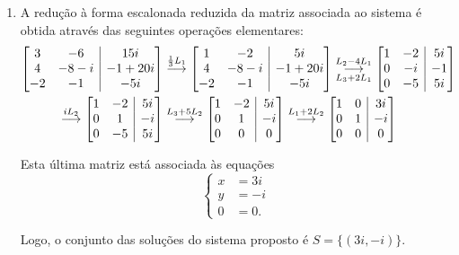 \documentclass[12pt,a4paper]{article}
\makeatletter
\newenvironment{amatrix}[1]{%
  \left[\begin{array}{@{}*{#1}{c}|c@{}}
}{%
  \end{array}\right]
}
\newcommand{\grstep}[2][\relax]{%
   \ensuremath{\mathrel{
       {\mathop{\longrightarrow}\limits^{#2\mathstrut}_{
                                     \begin{subarray}{l} #1 \end{subarray}}}}}}
\makeatother
\begin{document}
\begin{enumerate}
\begin{enumerate}
\item A redução à forma escalonada reduzida da matriz associada ao sistema é obtida através das seguintes operações elementares:
\begin{align*}
\begin{amatrix}{2}
 3 & -6     & 15i \\
 4 & -8-i & -1+20i \\
-2 & -1     & -5i
\end{amatrix}
&
\grstep{ \frac{1}{3} L_1 }
\begin{amatrix}{2}
 1 & -2     & 5i \\
 4 & -8-i & -1+20i \\
-2 & -1     & -5i
\end{amatrix}
\grstep[L_3 + 2 L_1]{ L_2 - 4 L_1 }
\begin{amatrix}{2}
1 & -2 & 5i \\
0 & -i & -1 \\
0 & -5 & 5i
\end{amatrix} \\
\grstep{ i L_2 }
\begin{amatrix}{2}
1 & -2 & 5i \\
0 & 1 & -i \\
0 & -5 & 5i
\end{amatrix}
&
\grstep{ L_3 + 5 L_2 }
\begin{amatrix}{2}
1 & -2 & 5i \\
0 & 1 & -i \\
0 & 0 & 0
\end{amatrix}
\grstep{ L_1 + 2 L_2 }
\begin{amatrix}{2}
1 & 0 & 3i \\
0 & 1 & -i \\
0 & 0 & 0
\end{amatrix}
\end{align*}

Esta última matriz está associada às equações
\[
\left\{
\begin{aligned}
x & =3i \\
y & =-i\\
0 & = 0.
\end{aligned}
\right.
\]

Logo, o conjunto das soluções do sistema proposto é
$S = \{ (3i, -i) \}$.


\end{enumerate}
\end{enumerate}
\end{document}
